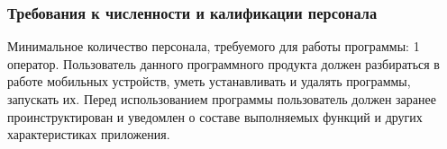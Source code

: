 \subsubsection{Требования к численности и калификации персонала}
Минимальное количество персонала, требуемого для работы программы: 1 оператор. Пользователь данного программного продукта должен разбираться в работе мобильных устройств, уметь устанавливать и удалять программы, запускать их. Перед использованием программы пользователь должен заранее проинструктирован и уведомлен о составе выполняемых функций и других характеристиках приложения.



